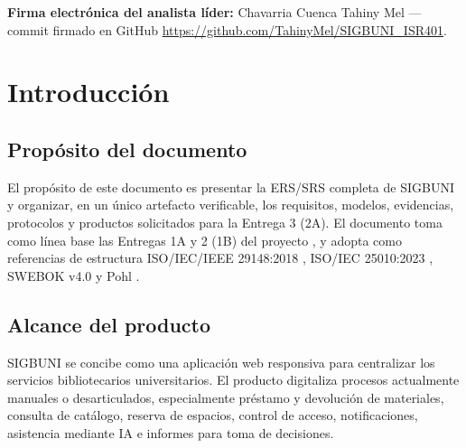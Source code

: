 \documentclass[12pt,journal,onecolumn]{IEEEtran}
\begin{document}
\vspace{1em}
\textbf{Firma electrónica del analista líder:} Chavarria Cuenca Tahiny Mel --- commit firmado en GitHub \url{https://github.com/TahinyMel/SIGBUNI_ISR401}.

\tableofcontents
\listoffigures
\listoftables
\clearpage

\section{Introducción}
\subsection{Propósito del documento}
El propósito de este documento es presentar la ERS/SRS completa de SIGBUNI y organizar, en un único artefacto verificable, los requisitos, modelos, evidencias, protocolos y productos solicitados para la Entrega 3 (2A). El documento toma como línea base las Entregas 1A y 2 (1B) del proyecto \cite{sigbuni1a2026,sigbuni1b2026}, y adopta como referencias de estructura ISO/IEC/IEEE 29148:2018 \cite{iso29148_2018}, ISO/IEC 25010:2023 \cite{iso25010_2023}, SWEBOK v4.0 \cite{swebok2024} y Pohl \cite{pohl2010}.

\subsection{Alcance del producto}
SIGBUNI se concibe como una aplicación web responsiva para centralizar los servicios bibliotecarios universitarios. El producto digitaliza procesos actualmente manuales o desarticulados, especialmente préstamo y devolución de materiales, consulta de catálogo, reserva de espacios, control de acceso, notificaciones, asistencia mediante IA e informes para toma de decisiones.
\end{document}
